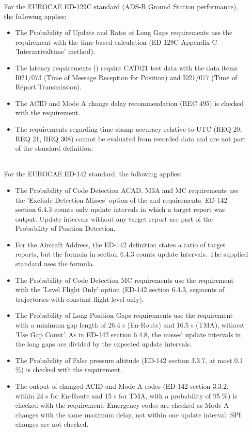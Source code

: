 For the EUROCAE ED-129C standard (ADS-B Ground Station performance), the following applies:
\begin{itemize}
\item The Probability of Update and Ratio of Long Gaps requirements use the  requirement with the time-based calculation (ED-129C Appendix C 'Interarrivaltime' method).
\item The latency requirements () require CAT021 test data with the data items I021/073 (Time of Message Reception for Position) and I021/077 (Time of Report Transmission).
\item The ACID and Mode A change delay recommendation (REC 495) is checked with the  requirement.
\item The requirements regarding time stamp accuracy relative to UTC (REQ 20, REQ 21, REQ 308) cannot be evaluated from recorded data and are not part of the standard definition.
\end{itemize}
\ \\

For the EUROCAE ED-142 standard, the following applies:
\begin{itemize}
\item The Probability of Code Detection ACAD, M3A and MC requirements use the 'Exclude Detection Misses' option of the  and  requirements. ED-142 section 6.4.3 counts only update intervals in which a target report was output. Update intervals without any target report are part of the Probability of Position Detection.
\item For the Aircraft Address, the ED-142 definition states a ratio of target reports, but the formula in section 6.4.3 counts update intervals. The supplied standard uses the formula.
\item The Probability of Code Detection MC requirements use the  requirement with the 'Level Flight Only' option (ED-142 section 6.4.3, segments of trajectories with constant flight level only).
\item The Probability of Long Position Gaps requirements use the  requirement with a minimum gap length of 26.4 s (En-Route) and 16.5 s (TMA), without 'Use Gap Count'. As in ED-142 section 6.4.8, the missed update intervals in the long gaps are divided by the expected update intervals.
\item The Probability of False pressure altitude (ED-142 section 3.3.7, at most 0.1 \%) is checked with the  requirement.
\item The output of changed ACID and Mode A codes (ED-142 section 3.3.2, within 24 s for En-Route and 15 s for TMA, with a probability of 95 \%) is checked with the  requirement. Emergency codes are checked as Mode A changes with the same maximum delay, not within one update interval. SPI changes are not checked.
\end{itemize}
\ \\

